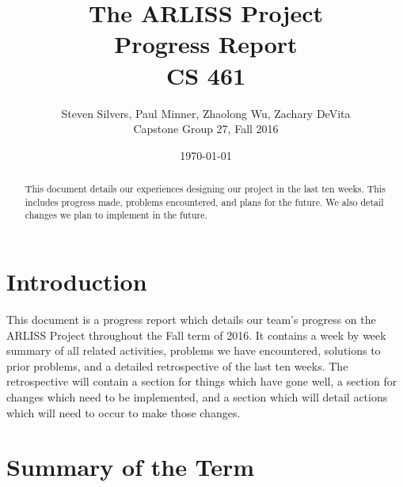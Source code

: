 \documentclass[10pt,letterpaper,onecolumn,draftclsnofoot,journal]{IEEEtran}
\begin{document}
\begin{titlepage}
	\title{The ARLISS Project\\Progress Report\\CS 461}
	\author{Steven Silvers, Paul Minner, Zhaolong Wu, Zachary DeVita\\
		Capstone Group 27, Fall 2016}
	\date{\today}
	\maketitle
	\vspace{4cm}
	\begin{abstract}
		\noindent This document details our experiences designing our project in the last ten weeks. This includes progress made, problems encountered, and plans for the future. We also detail changes we plan to implement in the future.
	\end{abstract}

\end{titlepage}
\tableofcontents
\clearpage

\section{Introduction}
This document is a progress report which details our team's progress on the ARLISS Project throughout the Fall term of 2016. It  contains a week by week summary of all related activities, problems we have encountered, solutions to prior problems, and a detailed retrospective of the last ten weeks. The retrospective will contain a section for things which have gone well, a section for changes which need to be implemented, and a section which will detail actions which will need to occur to make those changes.  

\section{Summary of the Term}
\end{document}
